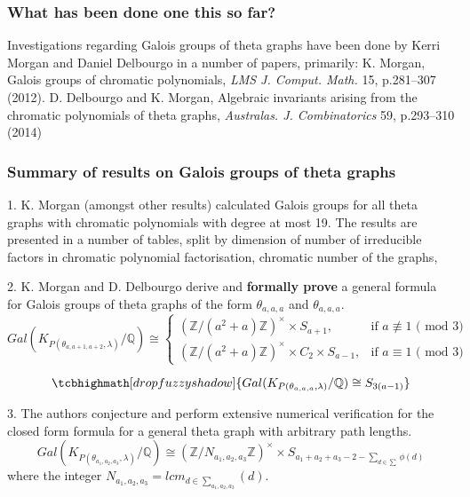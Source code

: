 \documentclass{beamer}
\begin{document}
\begin{frame}
\frametitle{What has been done one this so far?}
Investigations regarding Galois groups of theta graphs have been done by Kerri Morgan and Daniel Delbourgo in a number of papers, primarily:
 K. Morgan,  Galois groups of chromatic polynomials, {\em LMS J. Comput. Math.} 15, p.281–307 (2012).
 D. Delbourgo and K. Morgan, Algebraic invariants arising from the chromatic polynomials of theta graphs, {\em Australas. J. Combinatorics} 59, p.293–310 (2014)


\end{frame}

\begin{frame}[shrink=20]
\frametitle{Summary of results on Galois groups of theta graphs}
1. K. Morgan (amongst other results) calculated Galois groups for all theta graphs with chromatic polynomials with degree at most 19. The results are presented in a number of tables, split by dimension of number of irreducible factors in chromatic polynomial factorisation, chromatic number of the graphs, 

2. K. Morgan and D. Delbourgo derive and \textbf{formally prove} a general formula for Galois groups of theta graphs of the form $\theta_{a,a,a}$ and $\theta_{a,a,a}$.
\begin{equation*}
Gal(K_{P(\theta_{a,a+1,a+2},\lambda)} / \mathbb{Q}) \cong \begin{cases}
			(\mathbb{Z}/(a^2+a)\mathbb{Z})^{\times} \times S_{a+1}, & \text{if } a \not\equiv 1 \text{ ( mod 3)} \\
            (\mathbb{Z}/(a^2+a)\mathbb{Z})^{\times} \times  C_2 \times S_{a-1}, & \text{if } a \equiv 1 \text{ ( mod 3)}
		 \end{cases} 
\end{equation*}



\begin{equation*}
\tcbhighmath[drop fuzzy shadow]{Gal(K_{P(\theta_{a,a,a},\lambda)} / \mathbb{Q}) \cong S_{3(a-1)}}
\end{equation*}

3. The authors conjecture and perform extensive numerical verification for the closed form formula for a general theta graph with arbitrary path lengths.
\begin{equation}
Gal(K_{P(\theta_{a_1,a_2,a_3},\lambda)}/\mathbb{Q}) \cong 
(\mathbb{Z}/N_{a_1,a_2,a_3}\mathbb{Z})^{\times} \times S_{a_1+a_2+a_3-2 - \sum_{d \in \sum }\phi(d) }
\end{equation}
where  the integer $N_{a_1,a_2,a_3}=lcm_{d \in \sum_{a_1,a_2,a_3}}(d)$.


\end{frame}
\end{document}
